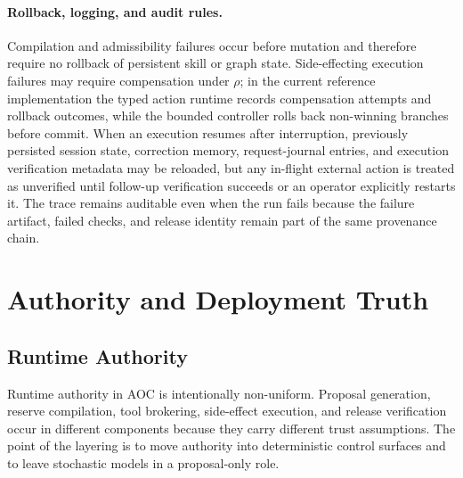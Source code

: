 \documentclass[11pt]{article}
\theoremstyle{remark}
\newcommand{\AOC}{\textup{\textsc{AOC}}}
\begin{document}
\paragraph{Rollback, logging, and audit rules.}
Compilation and admissibility failures occur before mutation and therefore require no rollback of persistent skill or graph state. Side-effecting execution failures may require compensation under \(\rho\); in the current reference implementation the typed action runtime records compensation attempts and rollback outcomes, while the bounded controller rolls back non-winning branches before commit. When an execution resumes after interruption, previously persisted session state, correction memory, request-journal entries, and execution verification metadata may be reloaded, but any in-flight external action is treated as unverified until follow-up verification succeeds or an operator explicitly restarts it. The trace remains auditable even when the run fails because the failure artifact, failed checks, and release identity remain part of the same provenance chain.

\section{Authority and Deployment Truth}

\subsection{Runtime Authority}\label{sec:runtime-authority}

Runtime authority in \AOC{} is intentionally non-uniform. Proposal generation, reserve compilation, tool brokering, side-effect execution, and release verification occur in different components because they carry different trust assumptions. The point of the layering is to move authority into deterministic control surfaces and to leave stochastic models in a proposal-only role.
\end{document}
